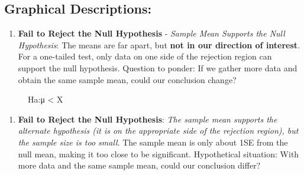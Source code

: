 \documentclass[
  letterpaper,
  DIV=11,
  numbers=noendperiod]{scrreprt}
\providecommand{\tightlist}{%
  \setlength{\itemsep}{0pt}\setlength{\parskip}{0pt}}\usepackage{longtable,booktabs,array}
\begin{document}
\subsection{Graphical Descriptions:}\label{graphical-descriptions}

\begin{enumerate}
\def\labelenumi{\arabic{enumi}.}
\tightlist
\item
  \textbf{Fail to Reject the Null Hypothesis} - \emph{Sample Mean
  Supports the Null Hypothesis}: The means are far apart, but
  \textbf{not in our direction of interest}. For a one-tailed test, only
  data on one side of the rejection region can support the null
  hypothesis. Question to ponder: If we gather more data and obtain the
  same sample mean, could our conclusion change?
\end{enumerate}

\begin{figure}


\caption{\label{fig-5-5.fail_to_reject_1}Ha:μ \textless{} X}

\end{figure}%

\begin{enumerate}
\def\labelenumi{\arabic{enumi}.}
\setcounter{enumi}{1}
\tightlist
\item
  \textbf{Fail to Reject the Null Hypothesis}: \emph{The sample mean
  supports the alternate hypothesis (it is on the appropriate side of
  the rejection region), but the sample size is too small}. The sample
  mean is only about 1SE from the null mean, making it too close to be
  significant. Hypothetical situation: With more data and the same
  sample mean, could our conclusion differ?
\end{enumerate}
\end{document}
